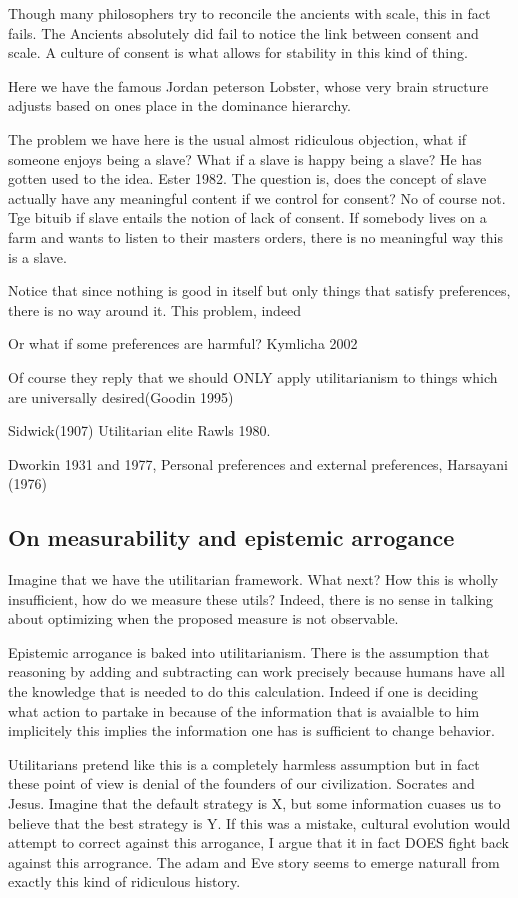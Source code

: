 \documentclass[12pt]{report}
\numberwithin{equation}{section}
\begin{document}
Though many philosophers try to reconcile the ancients with scale, this in fact fails. The Ancients absolutely did fail to notice the link between consent and scale. A culture of consent is what allows for stability in this kind of thing. 

Here we have the famous Jordan peterson Lobster, whose very brain structure adjusts based on ones place in the dominance hierarchy. 

The problem we have here is the usual almost ridiculous objection, what if someone enjoys being a slave? What if a slave is happy being a slave? He has gotten used to the idea. Ester 1982. The question is, does the concept of slave actually have any meaningful content if we control for consent? No of course not. Tge bituib if slave entails the notion of lack of consent. If somebody lives on a farm and wants to listen to their masters orders, there is no meaningful way this is a slave. 


Notice that since nothing is good in itself but only things that satisfy preferences, there is no way around it. This problem, indeed 



Or what if some preferences are harmful? Kymlicha 2002

Of course they reply that we should ONLY apply utilitarianism to things which are universally desired(Goodin 1995)

Sidwick(1907) Utilitarian elite Rawls 1980. 

Dworkin 1931 and 1977, Personal preferences and external preferences, Harsayani (1976)


\subsection{On measurability and epistemic arrogance}
Imagine that we have the utilitarian framework. What next? How this is wholly insufficient, how do we measure these utils? Indeed, there is no sense in talking about optimizing when the proposed measure is not observable. 

Epistemic arrogance is baked into utilitarianism. There is the assumption that reasoning by adding and subtracting can work precisely because humans have all the knowledge that is needed to do this calculation. Indeed if one is deciding what action to partake in because of the information that is avaialble to him implicitely this implies the information one has is sufficient to change behavior. 

Utilitarians pretend like this is a completely harmless assumption but in fact these point of view is denial of the founders of our civilization. Socrates and Jesus. Imagine that the default strategy is X, but some information cuases us to believe that the best strategy is Y. If this was a mistake, cultural evolution would attempt to correct against this arrogance, I argue that it in fact DOES fight back against this arrogrance. The adam and Eve story seems to emerge naturall from exactly this kind of ridiculous history. 
\end{document}
